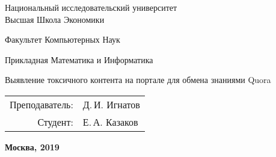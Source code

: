 \begin{titlepage}
\begin{center} %

\bfseries

	{\Large Национальный исследовательский университет  \\
	Высшая Школа Экономики
	
	} %

\vspace{48pt}


	{\large Факультет Компьютерных Наук
	
	}


\vspace{12pt}


	{\large  { Прикладная Математика и Информатика}
	
	} %

\vspace{72pt}

	{\Huge Выявление токсичного контента на портале для обмена знаниями Quora
	
	}

\vspace{12pt}


\end{center} %

\vspace{60pt}

	\begin{flushright}
		\begin{tabular}{rl}
			Преподаватель: & Д.\,И. Игнатов \\
			Студент: & Е.\,А. Казаков \\
		\end{tabular}
	\end{flushright}

\vfill

	\begin{center} %
		\bfseries
		Москва, 2019
	\end{center}
	
\end{titlepage} 

